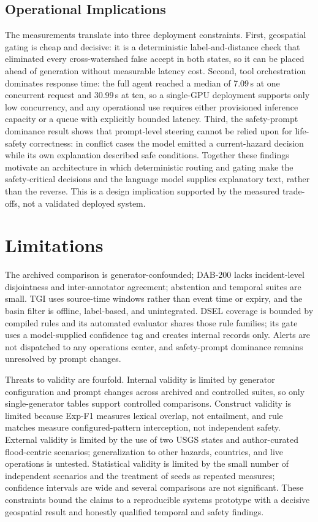 \documentclass[conference]{IEEEtran}
\begin{document}
\subsection{Operational Implications}
The measurements translate into three deployment constraints. First, geospatial gating is cheap and decisive: it is a deterministic label-and-distance check that eliminated every cross-watershed false accept in both states, so it can be placed ahead of generation without measurable latency cost. Second, tool orchestration dominates response time: the full agent reached a median of 7.09\,s at one concurrent request and 30.99\,s at ten, so a single-GPU deployment supports only low concurrency, and any operational use requires either provisioned inference capacity or a queue with explicitly bounded latency. Third, the safety-prompt dominance result shows that prompt-level steering cannot be relied upon for life-safety correctness: in conflict cases the model emitted a current-hazard decision while its own explanation described safe conditions. Together these findings motivate an architecture in which deterministic routing and gating make the safety-critical decisions and the language model supplies explanatory text, rather than the reverse. This is a design implication supported by the measured trade-offs, not a validated deployed system.

\section{Limitations}
The archived comparison is generator-confounded; DAB-200 lacks incident-level disjointness and inter-annotator agreement; abstention and temporal suites are small. TGI uses source-time windows rather than event time or expiry, and the basin filter is offline, label-based, and unintegrated. DSEL coverage is bounded by compiled rules and its automated evaluator shares those rule families; its gate uses a model-supplied confidence tag and creates internal records only. Alerts are not dispatched to any operations center, and safety-prompt dominance remains unresolved by prompt changes.

Threats to validity are fourfold. Internal validity is limited by generator configuration and prompt changes across archived and controlled suites, so only single-generator tables support controlled comparisons. Construct validity is limited because Exp-F1 measures lexical overlap, not entailment, and rule matches measure configured-pattern interception, not independent safety. External validity is limited by the use of two USGS states and author-curated flood-centric scenarios; generalization to other hazards, countries, and live operations is untested. Statistical validity is limited by the small number of independent scenarios and the treatment of seeds as repeated measures; confidence intervals are wide and several comparisons are not significant. These constraints bound the claims to a reproducible systems prototype with a decisive geospatial result and honestly qualified temporal and safety findings.
\end{document}
